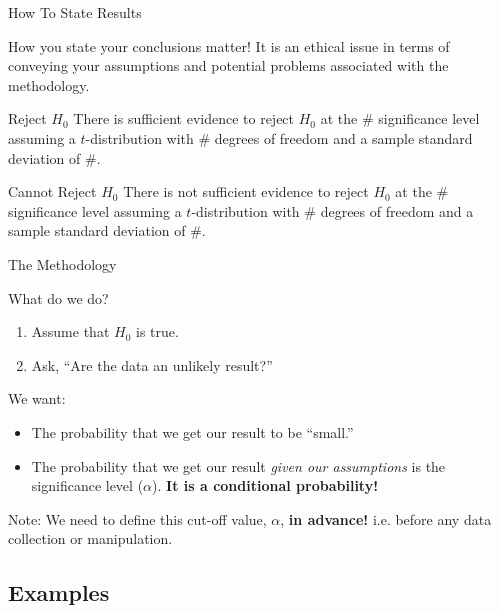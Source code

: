 \begin{frame}{How To State Results}

  How you state your conclusions matter! It is an ethical issue in
  terms of conveying your assumptions and potential problems
  associated with the methodology.

  \begin{block}{Reject $H_0$}
    There is sufficient evidence to reject $H_0$ at the \#
    significance level assuming a $t$-distribution with \# degrees of
    freedom and a sample standard deviation of \#.
  \end{block}

  \begin{block}{Cannot Reject $H_0$}
    There is not sufficient evidence to reject $H_0$ at the \#
    significance level assuming a $t$-distribution with \# degrees of
    freedom and a sample standard deviation of \#.
  \end{block}

  
\end{frame}

\begin{frame}{The Methodology}

  What do we do?

  \begin{enumerate}
  \item Assume that $H_0$ is true.
  \item Ask, ``Are the data an unlikely result?''
  \end{enumerate}

  {
    We want:
    \begin{itemize}
    \item The probability that we get our result to be ``small.''
    \item The probability that we get our result \textit{given our
        assumptions} is the significance level
      ($\alpha$). \textbf{\color{red} It is a conditional
        probability!}
    \end{itemize}
  }

  {
    Note: We need to define this cut-off value, $\alpha$, \textbf{in
      advance!} i.e. before any data collection or manipulation.
  }
  
\end{frame}


\subsection{Examples}

